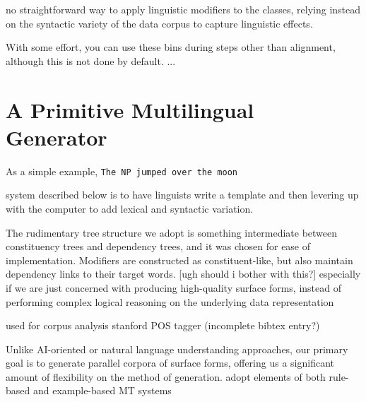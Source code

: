 no straightforward way to apply linguistic modifiers to the classes, relying instead on the syntactic variety of the data corpus to capture linguistic effects.

With some effort, you can use these bins during steps other than alignment, although this is not done by default.
...





























\section{A Primitive Multilingual Generator}
\label{sec:generator}

As a simple example, 
{\small \tt The NP jumped over the moon}

system described below is to have linguists write a template and then levering up with the computer to add lexical and syntactic variation.  

The rudimentary tree structure we adopt is something intermediate between constituency trees and dependency trees, and it was chosen for ease of implementation. 
Modifiers are constructed as constituent-like, but also maintain dependency links to their target words.
[ugh should i bother with this?]
especially if we are just concerned with producing high-quality surface forms, instead of performing complex logical reasoning on the underlying data representation




used for corpus analysis stanford POS tagger (incomplete bibtex entry?) 

Unlike AI-oriented or natural language understanding approaches, our primary goal is to generate parallel corpora of surface forms, offering us a significant amount of flexibility on the method of generation. 
adopt elements of both rule-based and example-based MT systems

